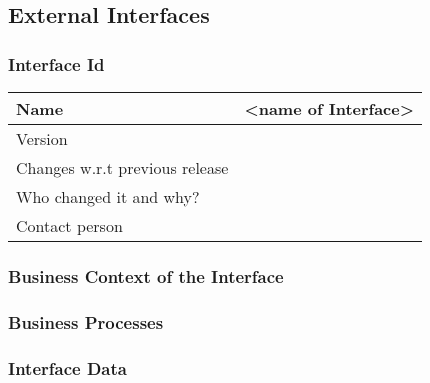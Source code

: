 

\subsection{External Interfaces}


\subsubsection{Interface Id}
%
\begin{center}
    \begin{tabular}{| l | p{6cm}  |}
		\hline
		\textbf {Name} & \textbf {<name of Interface>} \\ \hline
		Version&\\ \hline
		Changes w.r.t previous release&\\ \hline
		Who changed it and why?&\\ \hline
		Contact person&\\ \hline
	\end{tabular}
\end{center}
%

\subsubsection{Business Context of the Interface}
%

\subsubsection{Business Processes}

\subsubsection{Interface Data}

